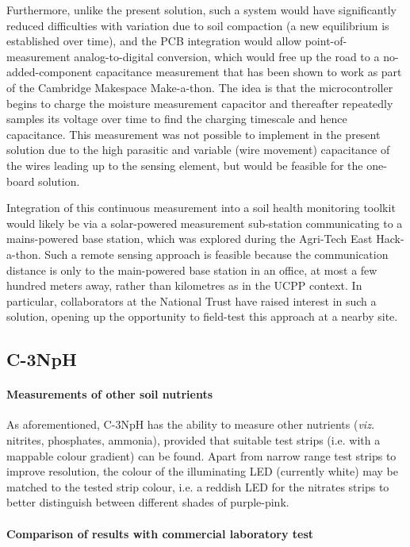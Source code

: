 Furthermore, unlike the present solution, such a system would have significantly reduced difficulties with variation due to soil compaction (a new equilibrium is established over time), and the PCB integration would allow point-of-measurement analog-to-digital conversion, which would free up the road to a no-added-component capacitance measurement that has been shown to work as part of the Cambridge Makespace Make-a-thon. The idea is that the microcontroller begins to charge the moisture measurement capacitor and thereafter repeatedly samples its voltage over time to find the charging timescale and hence capacitance. This measurement was not possible to implement in the present solution due to the high parasitic and variable (wire movement) capacitance of the wires leading up to the sensing element, but would be feasible for the one-board solution.

Integration of this continuous measurement into a soil health monitoring toolkit would likely be via a solar-powered measurement sub-station communicating to a mains-powered base station, which was explored during the Agri-Tech East Hack-a-thon. Such a remote sensing approach is feasible because the communication distance is only to the main-powered base station in an office, at most a few hundred meters away, rather than kilometres as in the UCPP context. In particular, collaborators at the National Trust have raised interest in such a solution, opening up the opportunity to field-test this approach at a nearby site. 

\subsection{C-3NpH} \label{future:c3nph}
\paragraph{Measurements of other soil nutrients} \label{future_nutrients_c3nph}

As aforementioned, C-3NpH has the ability to measure other nutrients (\textit{viz.} nitrites, phosphates, ammonia), provided that suitable test strips (i.e. with a mappable colour gradient) can be found. Apart from narrow range test strips to improve resolution, the colour of the illuminating LED (currently white) may be matched to the tested strip colour, i.e. a reddish LED for the nitrates strips to better distinguish between different shades of purple-pink. 
\paragraph{Comparison of results with commercial laboratory test}

